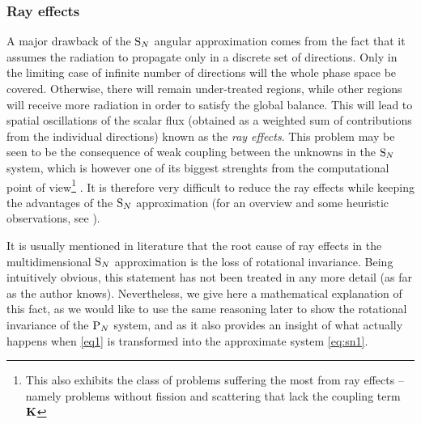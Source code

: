 \subsubsection{Ray effects}
A major drawback of the $\text{S}_{N}$ angular approximation comes from the fact that it assumes the radiation to propagate only
in a discrete set of directions. Only in the limiting case of infinite number of directions will the whole phase space
be covered. Otherwise, there will remain under-treated regions, while other regions will receive more radiation in order
to satisfy the global balance. This will lead to spatial oscillations of the scalar flux (obtained as a weighted sum of
 contributions from the individual directions) known as the \textit{ray effects}. This problem may be seen to be the
consequence of weak coupling between the unknowns in the $\text{S}_{N}$ system, which is however one of its biggest strenghts
from the computational point of view\footnote{This also exhibits the class of problems suffering the most from ray
effects -- namely problems without fission and scattering that lack the coupling term $\mathbf{K}$} .
It is therefore very difficult to reduce the ray effects while keeping the advantages of the $\text{S}_{N}$ approximation (for an
overview and some heuristic observations, see \cite{Li1}). 

It is usually mentioned in literature that the root cause of ray
effects in the multidimensional $\text{S}_{N}$ approximation is the loss of rotational invariance. Being intuitively obvious,
this statement has not been treated in any more detail (as far as the author knows). Nevertheless, we give here a
mathematical explanation of this fact, as we would like to use the same reasoning later to show the rotational 
invariance of the $\text{P}_{N}$ system, and as it also provides an insight of what actually happens when \eqref{eq1} is 
transformed into the approximate system \eqref{eq:sn1}.

